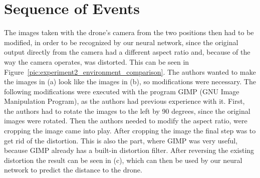 \section{Sequence of Events}
The images taken with the drone's camera from the two positions then had to be modified, in order to be recognized by our neural network, since the original output directly from the camera had a different aspect ratio and, because of the way the camera operates, was distorted. This can be seen in Figure~\ref{pic:experiment2_environment_comparison}. The authors wanted to make the images in (a) look like the images in (b), so modifications were necessary. The following modifications were executed with the program GIMP (GNU Image Manipulation Program), as the authors had previous experience with it.
First, the authors had to rotate the images to the left by 90 degrees, since the original images were rotated. Then the authors needed to modify the aspect ratio, were cropping the image came into play. After cropping the image the final step was to get rid of the distortion. This is also the part, where GIMP was very useful, because GIMP already has a built-in distortion filter. After reversing the existing distortion the result can be seen in (c), which can then be used by our neural network to predict the distance to the drone.

